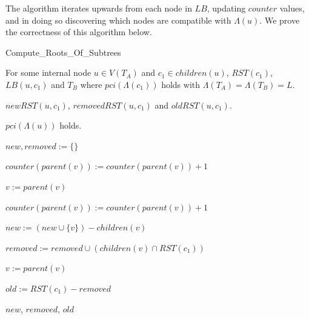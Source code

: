 \documentclass{article}
\newcommand{\leafset}{\Lambda}
\begin{document}
    The algorithm iterates upwards from each node in $LB$, updating $counter$ values, and in doing so discovering which nodes are compatible with $\leafset(u)$. We prove the correctness of this algorithm below.

    \begin{algorithm}
        \caption{Compute\_Roots\_Of\_Subtrees}
        \label{alg:computerootsofsubtrees}

        \begin{algorithmic}[1]
            \Input For some internal node $u \in V(T_A)$ and $c_1 \in children(u)$, $RST(c_1)$, $LB(u, c_1)$ and $T_B$ where $pci(\leafset(c_1))$ holds with $\leafset(T_A) = \leafset(T_B) = L$.

            \Output $newRST(u, c_1)$, $removedRST(u, c_1)$ and $oldRST(u, c_1)$.

            \SideEffect $pci(\leafset(u))$ holds.

            \State $new, removed := \{\}$

                \State $counter(parent(v)) := counter(parent(v)) + 1$

                \State $v := parent(v)$

                    \State $counter(parent(v)) := counter(parent(v)) + 1$

                    \State $new := (new \cup \{v\}) - children(v)$

                    \State $removed := removed \cup (children(v) \cap RST(c_1))$

                    \State $v := parent(v)$
                \EndWhile
            \EndFor

            \State $old := RST(c_1) - removed$

            \State \Return $new$, $removed$, $old$
        \end{algorithmic}
    \end{algorithm}
\end{document}
